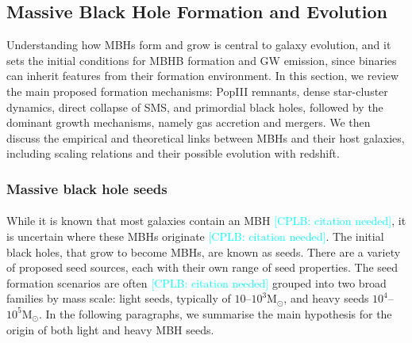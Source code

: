\documentclass[a4paper,12pt]{article}
\newcommand{\cplb}[1]{\textcolor{cyan}{[CPLB: #1]}}
\begin{document}
\subsection{Massive Black Hole Formation and Evolution}
\label{sec:MBHFormEv}

Understanding how MBHs form and grow is central to galaxy evolution, and it sets the initial conditions for MBHB formation and GW emission, since binaries can inherit features from their formation environment. In this section, we review the main proposed formation mechanisms: PopIII remnants, dense star-cluster dynamics, direct collapse of SMS, and primordial black holes, followed by the dominant growth mechanisms, namely gas accretion and mergers. We then discuss the empirical and theoretical links between MBHs and their host galaxies, including scaling relations and their possible evolution with redshift.

\subsubsection{Massive black hole seeds}
\label{subsec:MBHseeds}

\paragraph{}
While it is known that most galaxies contain an MBH \cplb{citation needed}, it is uncertain where these MBHs originate \cplb{citation needed}. 
The initial black holes, that grow to become MBHs, are known as seeds. There are a variety of proposed seed sources, each with their own range of seed properties. The seed formation scenarios are often \cplb{citation needed} grouped into two broad families by mass scale: light seeds, typically of $10$--$10^3\mathrm{M}_{\odot}$, and heavy seeds $10^4$--$10^5\mathrm{M}_{\odot}$. In the following paragraphs, we summarise the main hypothesis for the origin of both light and heavy MBH seeds. 
\end{document}
